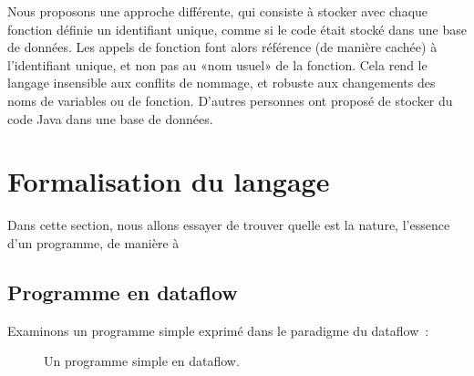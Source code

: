 \documentclass{article}
\begin{document}
Nous proposons une approche différente, qui consiste à stocker avec chaque fonction définie un identifiant unique, comme si le code était
stocké dans une base de données. Les appels de fonction font alors référence (de manière cachée) à l'identifiant unique, et non pas au «nom
usuel» de la fonction. Cela rend le langage insensible aux conflits de nommage, et robuste aux changements des noms de variables ou de
fonction. D'autres personnes ont proposé de stocker du code Java dans une base de données\cite{scid}.

\section{Formalisation du langage}

Dans cette section, nous allons essayer de trouver quelle est la nature, l'essence d'un programme, de manière à 

\subsection{Programme en dataflow}

Examinons un programme simple exprimé dans le paradigme du dataflow~:

\begin{figure}[h]
  \centering
  \caption{Un programme simple en dataflow.}
\label{fig:simple-dataflow}
\end{figure}
\end{document}
